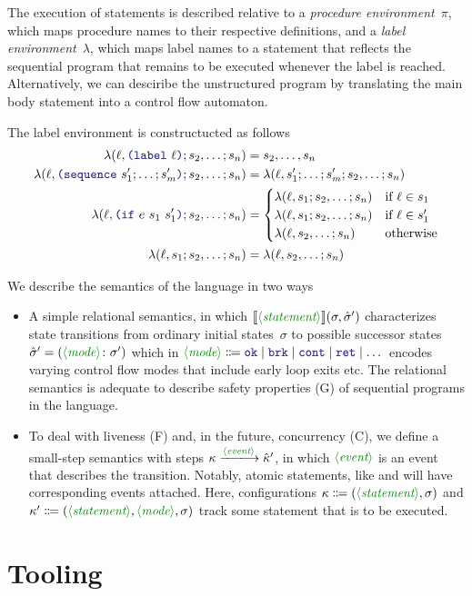 \documentclass[runningheads]{llncs}
\begin{document}
The execution of statements is described relative to
a \emph{procedure environment}~$\pi$,
which maps procedure names to their respective definitions,
and a \emph{label environment}~$\lambda$,
which maps label names to a statement that reflects
the sequential program that remains to be executed
whenever the label is reached.
Alternatively, we can desciribe the unstructured program
by translating the main body statement into a control flow automaton.

The label environment is constructucted as follows
\begin{align*}
\lambda(\ell,\LP \terminal{label}~ \ell \RP; s_2,\dots; s_n)
    &= s_2,\dots,s_n \\
\lambda(\ell,\LP \terminal{sequence}~ s'_1; \dots; s'_m \RP; s_2,\dots; s_n)
    &= \lambda(\ell, s'_1; \dots; s'_m; s_2,\dots; s_n) \\
\lambda(\ell,\LP \terminal{if}~e~s_1~s'_1 \RP; s_2,\dots; s_n)
    &= \begin{cases}
       \lambda(\ell, s_1; s_2,\dots; s_n) & \text{if } \ell \in s_1 \\
       \lambda(\ell, s_1; s_2,\dots; s_n) & \text{if } \ell \in s'_1 \\
       \lambda(\ell, s_2,\dots; s_n) & \text{otherwise}
       \end{cases} \\
\lambda(\ell,s_1; s_2,\dots; s_n)
    &= \lambda(\ell, s_2,\dots; s_n) \\
\end{align*}

We describe the semantics of the language in two ways
\begin{itemize}
\item A simple relational semantics, in which $\sem{\nonterminal{statement}}(\sigma,\hat\sigma')$ characterizes state transitions from ordinary initial states~$\sigma$
to possible successor states~$\hat\sigma' = (\nonterminal{mode} \colon \sigma')$ which in 
$\nonterminal{mode} \Coloneqq \terminal{ok} \mid \terminal{brk} \mid \terminal{cont} \mid \terminal{ret} \mid \dots$
encodes varying control flow modes that include early loop exits etc.
The relational semantics is adequate to describe safety properties (G)
of sequential programs in the language.
\item To deal with liveness (F) and, in the future, concurrency (C),
we define a small-step semantics with steps $\kappa \xlongrightarrow{\nonterminal{event}} \hat\kappa'$,
in which $\nonterminal{event}$ is an event that describes the transition.
Notably, atomic statements, like  and 
will have corresponding events attached.
Here, configurations $\kappa \Coloneqq (\nonterminal{statement},\sigma)$
and $\kappa' \Coloneqq (\nonterminal{statement},\nonterminal{mode},\sigma)$
track some statement that is to be executed.
\end{itemize}

\section{Tooling}
\end{document}
